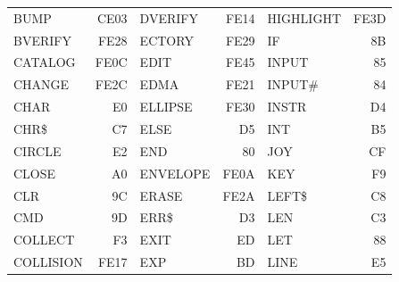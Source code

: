 {\begin{tabular}{|p{2.2cm}r|p{2.2cm}r|p{2.2cm}r|}
BUMP       & CE03 &DVERIFY    & FE14 &HIGHLIGHT  & FE3D \\
BVERIFY    & FE28 &ECTORY     & FE29 &IF         &   8B \\
CATALOG    & FE0C &EDIT       & FE45 &INPUT      &   85 \\
CHANGE     & FE2C &EDMA       & FE21 &INPUT\#    &   84 \\
CHAR       &   E0 &ELLIPSE    & FE30 &INSTR      &   D4 \\
CHR\$      &   C7 &ELSE       &   D5 &INT        &   B5 \\
CIRCLE     &   E2 &END        &   80 &JOY        &   CF \\
CLOSE      &   A0 &ENVELOPE   & FE0A &KEY        &   F9 \\
CLR        &   9C &ERASE      & FE2A &LEFT\$     &   C8 \\
CMD        &   9D &ERR\$      &   D3 &LEN        &   C3 \\
COLLECT    &   F3 &EXIT       &   ED &LET        &   88 \\
COLLISION  & FE17 &EXP        &   BD &LINE       &   E5 \\
\hline
\end{tabular}}
\newpage
